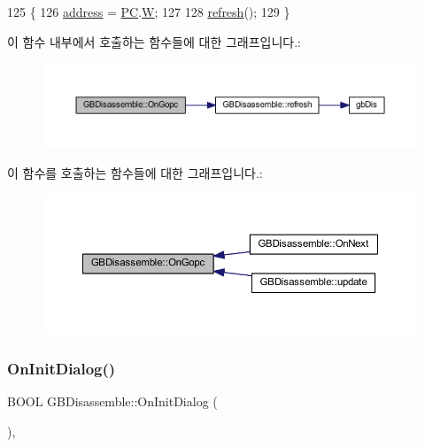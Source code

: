 \begin{DoxyCode}
125 \{
126   \mbox{\hyperlink{class_g_b_disassemble_afcfc78edb6d25dc9ef3f0ae25ac6731f}{address}} = \mbox{\hyperlink{_g_b_disassemble_8cpp_abc78e2e4c6db630eeae9741c27e9bda3}{PC}}.\mbox{\hyperlink{uniongb_register_ab3d596e48605bc14793ff0292e6ed814}{W}};
127 
128   \mbox{\hyperlink{class_g_b_disassemble_a0ae217c08ead8a3cf62c59dadaa27fde}{refresh}}();
129 \}
\end{DoxyCode}
이 함수 내부에서 호출하는 함수들에 대한 그래프입니다.\+:
\nopagebreak
\begin{figure}[H]
\begin{center}
\leavevmode
\includegraphics[width=350pt]{class_g_b_disassemble_abd524f55b59a178d22778d9e5b80905f_cgraph}
\end{center}
\end{figure}
이 함수를 호출하는 함수들에 대한 그래프입니다.\+:
\nopagebreak
\begin{figure}[H]
\begin{center}
\leavevmode
\includegraphics[width=350pt]{class_g_b_disassemble_abd524f55b59a178d22778d9e5b80905f_icgraph}
\end{center}
\end{figure}
\mbox{\label{class_g_b_disassemble_a62b06166477944c21edeeda699fcdba5}} 
\subsubsection{\texorpdfstring{On\+Init\+Dialog()}{OnInitDialog()}}
{\footnotesize\ttfamily B\+O\+OL G\+B\+Disassemble\+::\+On\+Init\+Dialog (\begin{DoxyParamCaption}{ }\end{DoxyParamCaption})\hspace{0.3cm}{\ttfamily [protected]}, {\ttfamily [virtual]}}



